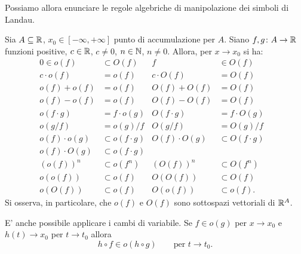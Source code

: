 Possiamo allora enunciare le regole algebriche di manipolazione dei simboli di Landau.

\begin{theorem}
Sia $A\subseteq \mathbb R$, $x_0\in [-\infty, +\infty]$
punto di accumulazione per $A$.
Siano $f,g \colon A \to \mathbb R$ funzioni positive, $c\in \mathbb R$, $c\neq 0$, $n\in \mathbb N$, $n\neq 0$.
Allora, per $x\to x_0$ si ha:
\begin{align*}
0 \in o(f) &\subset O(f) & f&\in O(f)& \\
c \cdot o(f) &= o(f) & c \cdot O(f) &= O(f)\\
o(f)+o(f) &= o(f) & O(f)+O(f) &= O(f)\\
o(f)-o(f) &= o(f) & O(f)-O(f) &= O(f)\\
o(f\cdot g) &= f \cdot o(g) & O(f\cdot g) &= f\cdot O(g)\\
o(g/f) &= o(g) / f & O(g/f) &= O(g) / f\\
o(f)\cdot o(g) &\subset o(f\cdot g) & O(f)\cdot O(g) &\subset O(f\cdot g) \\
o(f)\cdot O(g) & \subset o(f\cdot g)&  & \\
(o(f))^n &\subset o(f^n) & (O(f))^n &\subset O(f^n)\\
o(o(f)) &\subset o(f) & O(O(f)) &\subset O(f)\\
o(O(f)) &\subset o(f) & O(o(f)) &\subset o(f)
.
\end{align*}
Si osserva, in particolare, che $o(f)$ e $O(f)$ sono sottospazi vettoriali di $\mathbb R^A$.

E' anche possibile applicare i cambi di variabile.
Se $f\in o(g)$ per $x\to x_0$ e $h(t) \to x_0$ per $t\to t_0$ allora
\[
  h \circ f \in o(h\circ g) \qquad \text{per $t\to t_0$}.
\]
\end{theorem}
%
